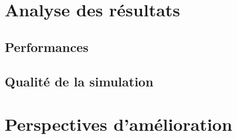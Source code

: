 \documentclass[12pt,a4paper,sans]{article}
\begin{document}

\section{Analyse des résultats}
\subsection{Performances}
\subsection{Qualité de la simulation}

\section{Perspectives d'amélioration}
\end{document}
